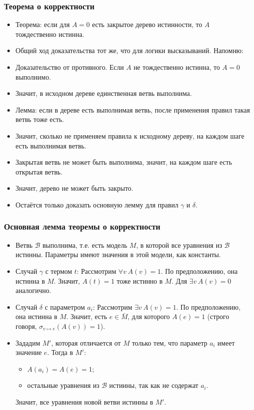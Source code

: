 \documentclass[10pt]{beamer}
\begin{document}
\begin{frame}
    \frametitle{Теорема о корректности}
    \begin{itemize}
        \item Теорема: если для $A=0$ есть закрытое дерево истинности, то $A$ тождественно истинна.
        \item Общий ход доказательства тот же, что для логики высказываний. Напомню:
        \pause
        \item Доказательство от противного. Если $A$ не тождественно истинна, то $A=0$ выполнимо.
        \item Значит, в исходном дереве единственная ветвь выполнима.
        \item Лемма: если в дереве есть выполнимая ветвь, после применения правил такая ветвь тоже есть.
        \item Значит, сколько не применяем правила к исходному дереву, на каждом шаге есть выполнимая ветвь.
        \item Закрытая ветвь не может быть выполнима, значит, на каждом шаге есть открытая ветвь.
        \item Значит, дерево не может быть закрыто.
        \pause
        \item Остаётся только доказать основную лемму для правил $\gamma$ и $\delta$.
    \end{itemize}
\end{frame}

\begin{frame}
    \frametitle{Основная лемма теоремы о корректности}
    \begin{itemize}
        \item Ветвь $\mathcal{B}$ выполнима, т.е. есть модель $M$, в которой все уравнения из $\mathcal{B}$ истинны. Параметры имеют значения в этой модели, как константы.
        \item Случай $\gamma$ с термом $t$: Рассмотрим $\forall v ~ A(v)=1$. По предположению, она истинна в $M$. Значит, $A(t)=1$ тоже истинно в $M$. Для $\exists v ~ A(v)=0$ аналогично.
        \pause
        \item Случай $\delta$ с параметром $a_i$: Рассмотрим $\exists v ~ A(v)=1$. По предположению, она истинна в $M$. Значит, есть $e \in \bar{M}$, для которого $A(e) = 1$ \pause (строго говоря, $\sigma_{v \mapsto e}(A(v)) = 1$).
        \item Зададим $M'$, которая отличается от $M$ только тем, что параметр $a_i$ имеет значение $e$. Тогда в $M'$: \begin{itemize}
            \item $A(a_i) = A(e) = 1$; 
            \item остальные уравнения из $\mathcal{B}$ истинны, так как \pause не содержат $a_i$.
        \end{itemize}
        Значит, все уравнения новой ветви истинны в $M'$.
    \end{itemize}
\end{frame}
\end{document}
